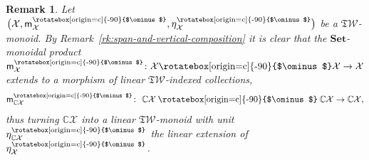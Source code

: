 \documentclass[pdftex]{sigma}
\newcommand\overt{\mathbin{\text{\rotatebox[origin=c]{-90}{$\ominus$}}}}
\newcommand{\linearspan}[1]{{\CC #1}}
\newcommand{\vertset}{{\overt}}
\newcommand{\SWc}{{\mathfrak{T}\mathcal{W}}}
\newcommand{\vp}{\mathsf{m}^{\overt}}
\newcommand\CAT[1]{\mathbf{#1}}
\newcommand{\Set}{\CAT{Set}}
\def\CC{\mathbb{C}}
\numberwithin{equation}{section}
\newtheorem{Remark}[Theorem]{Remark}
\begin{document}
\begin{Remark}
Let $\big(\mathcal{X},\mathsf{m}^\vertset_{\mathcal X},\eta^\vertset_{\mathcal X}\big)$ be a $\SWc$-monoid.
By Remark~\ref{rk:span-and-vertical-composition} it is clear that the $\Set$-monoidal product $\mathsf{m}_{\mathcal X}^\vertset\colon \mathcal{X}\vertset \mathcal{X} \to \mathcal{X}$ extends to a morphism of linear $\SWc$-indexed collections,
\begin{equation*}
	\vp_{\mathbb C\mathcal X}\colon \ \linearspan{\mathcal{X}}\overt \linearspan{\mathcal{X}} \to \linearspan{\mathcal{X}},
\end{equation*}
thus turning $\linearspan{\mathcal{X}}$ into a linear $\SWc$-monoid with unit $\eta^{\overt}_{\mathbb C\mathcal X}$ the linear extension of $\eta^\vertset_{\mathcal X}$.
\end{Remark}
\end{document}
